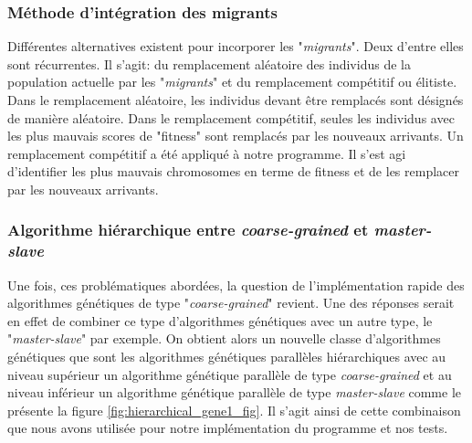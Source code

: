 \documentclass[12pt,a4paper]{article}
\begin{document}
	\subsubsection{Méthode d'intégration des migrants}
 	Différentes alternatives existent pour incorporer les "\emph{migrants}". Deux d'entre elles sont récurrentes. Il s'agit: du remplacement aléatoire des individus de la population actuelle par les "\emph{migrants}" et du remplacement compétitif ou élitiste. Dans le remplacement aléatoire, les individus devant être remplacés sont désignés de manière aléatoire. Dans le remplacement compétitif, seules les individus avec les plus mauvais scores de "fitness" sont remplacés par les nouveaux arrivants. Un remplacement compétitif a été appliqué à notre programme. Il s'est agi d'identifier les plus mauvais chromosomes en terme de fitness et de les remplacer par les nouveaux arrivants.\\
 	\subsubsection{Algorithme hiérarchique entre \emph{coarse-grained} et \emph{master-slave}}
 	\hspace*{.5cm} Une fois, ces problématiques abordées, la question de l'implémentation rapide des algorithmes génétiques de type "\emph{coarse-grained}" revient. Une des réponses serait en effet de combiner ce type d'algorithmes génétiques avec un autre type, le "\emph{master-slave}" par exemple. On obtient alors un nouvelle classe d'algorithmes génétiques que sont les algorithmes génétiques parallèles hiérarchiques avec au niveau supérieur un algorithme génétique parallèle de type \emph{coarse-grained} et au niveau inférieur un algorithme génétique parallèle de type \emph{master-slave} comme le présente la figure \ref{fig:hierarchical_gene1_fig}. Il s'agit ainsi de cette combinaison que nous avons utilisée pour notre implémentation du programme et nos tests.
 	
\end{document}

